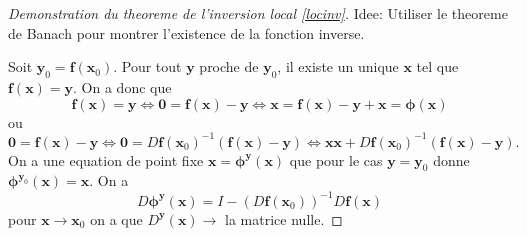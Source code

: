 \begin{proof}[Demonstration du theoreme de l'inversion local \ref{locinv}]
Idee: Utiliser le theoreme de Banach pour montrer l'existence de la fonction inverse.

Soit $\boldsymbol{y}_{0}=\boldsymbol{f}(\boldsymbol{x}_{0})$. Pour tout $\boldsymbol{y}$ proche de $\boldsymbol{y}_{0}$, il existe un unique $\boldsymbol{x}$ tel que $\boldsymbol{f}(\boldsymbol{x})=\boldsymbol{y}$. On a donc que $$\boldsymbol{f}(\boldsymbol{x})=\boldsymbol{y}\Leftrightarrow \boldsymbol{0}=\boldsymbol{f}(\boldsymbol{x})-\boldsymbol{y}\Leftrightarrow\boldsymbol{x}=\boldsymbol{f}(\boldsymbol{x})-\boldsymbol{y}+\boldsymbol{x}=\boldsymbol{\phi}(\boldsymbol{x})$$
ou
$$
\boldsymbol{0}=\boldsymbol{f}(\boldsymbol{x})-\boldsymbol{y}\Leftrightarrow \boldsymbol{0}=D\boldsymbol{f}(\boldsymbol{x}_{0})^{-1}(\boldsymbol{f}(\boldsymbol{x})-\boldsymbol{y})\Leftrightarrow \boldsymbol{x}\boldsymbol{x}+D\boldsymbol{f}(\boldsymbol{x}_{0})^{-1}(\boldsymbol{f}(\boldsymbol{x})-\boldsymbol{y}).
$$
On a une equation de point fixe $\boldsymbol{x}=\boldsymbol{\phi}^{\boldsymbol{y}}(\boldsymbol{x})$ que pour le cas $\boldsymbol{y}=\boldsymbol{y}_{0}$ donne $\boldsymbol{\phi}^{\boldsymbol{y}_{0}}(\boldsymbol{x})=\boldsymbol{x}$. On a 
$$
D\boldsymbol{\phi}^{\boldsymbol{y}}(\boldsymbol{x})=I-(D\boldsymbol{f}(\boldsymbol{x}_{0}))^{-1}D\boldsymbol{f}(\boldsymbol{x})
$$
pour $\boldsymbol{x}\to \boldsymbol{x}_{0}$ on a que $D^{\boldsymbol{y}}(\boldsymbol{x})\to$ la matrice nulle.


\end{proof}

